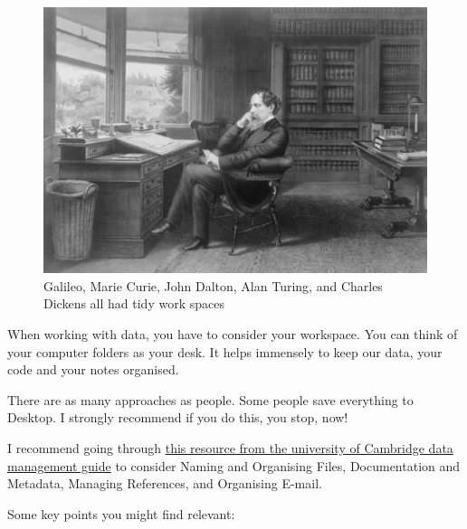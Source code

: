\documentclass[
]{book}
\begin{document}
\begin{figure}
\includegraphics[width=6.94in]{imgs/charles_dickens_desk} \caption{\label{fig:figs}Galileo, Marie Curie, John Dalton, Alan Turing, and Charles Dickens all had tidy work spaces}\label{fig:unnamed-chunk-3-5}
\end{figure}

When working with data, you have to consider your workspace. You can think of your computer folders as your desk. It helps immensely to keep our data, your code and your notes organised.

There are as many approaches as people. Some people save everything to Desktop. I strongly recommend if you do this, you stop, now!

I recommend going through \href{https://www.data.cam.ac.uk/data-management-guide/organising-your-data}{this resource from the university of Cambridge data management guide} to consider Naming and Organising Files, Documentation and Metadata, Managing References, and Organising E-mail.

Some key points you might find relevant:
\end{document}
